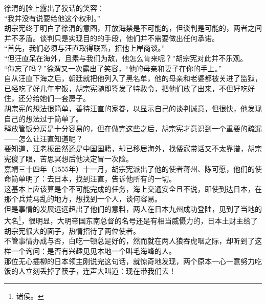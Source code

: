\begin{multicols}{\theparacolNo}
徐渭的脸上露出了狡诘的笑容：\\

“我并没有说要给他这个权利。”\\

胡宗宪终于明白了徐渭的意图，开放海禁是不可能的，但谈判是可能的，两者之间并不矛盾。谈判只是实现目的的手段，他们并不需要做出任何承诺。\\

“首先，我们必须与汪直取得联系，招他上岸商谈。”\\

“但汪直呆在海外，且素与我们为敌，他怎么肯来呢？”胡宗宪对此并不乐观。\\

“你忘了吗？”徐渭又一次露出了笑容，“他的母亲和妻子在你的手上。”\\

自从汪直下海之后，朝廷就把他列入了黑名单，他的母亲和老婆都被关进了监狱，已经吃了好几年牢饭，胡宗宪随即签发了特赦令，把他们放了出来，不但好吃好住，还分给她们一套房子。\\

胡宗宪的想法很简单，善待汪直的家眷，以显示自己的谈判诚意，但很快，他发现自己的想法过于简单了。\\

释放管饭分房是十分容易的，但在做完这些之后，胡宗宪才意识到一个重要的疏漏——怎么让汪直知道呢？\\

要知道，汪老板虽然还是中国国籍，却已移居海外，找倭寇带话又不太靠谱，胡宗宪傻了眼，苦思冥想后他决定冒一次险。\\

嘉靖三十四年（1555年）十一月，胡宗宪派出了他的使者蒋州、陈可愿，他们的使命简单明了：去日本，找到汪直，告诉他所有的一切。\\

这基本上应该算是个不可能完成的任务，海上交通安全且不说，即使到达日本，在那个兵荒马乱的地方，想找到一个人，谈何容易。\\

但是事情的发展远远超出了他们的意料，两人在日本九州成功登陆，见到了当地的大名\footnote{诸侯。}，很明显，大明帝国东南总督的名号还是有相当威慑力的，日本土财主给了胡宗宪很大的面子，热情招待了两位使者。\\

不管事情办成与否，白吃一顿总是好的，然而就在两人狼吞虎咽之际，却听到了这样一个询问：是否有兴趣见见本地一个叫毛海峰的人。\\

那位无心插柳的日本领主刚说完这句话，就惊奇地发现，两个原本一心一意努力吃饭的人立刻丢掉了筷子，连声大叫道：现在带我们去！\\


\end{multicols}
